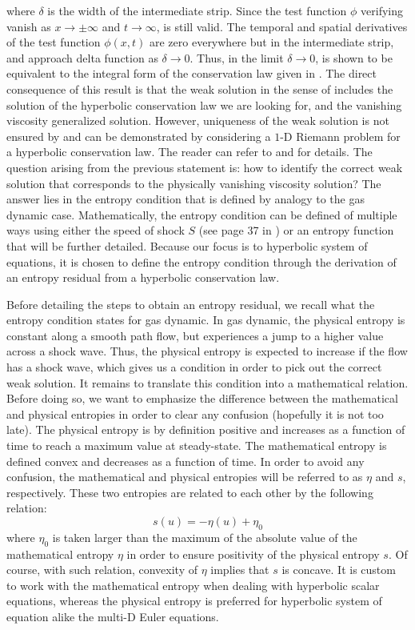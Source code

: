 where $\delta$ is the width of the intermediate strip. Since the test function $\phi$ verifying  vanish as $x \to \pm  \infty$ and $t \to \infty$,  is still valid. The temporal and spatial derivatives of the test function $\phi(x,t)$ are zero everywhere but in the intermediate strip, and approach delta function as $\delta \to 0$. Thus, in the limit $\delta \to 0$,  is shown to be equivalent to the integral form of the conservation law given in . The direct consequence of this result is that the weak solution in the sense of  includes the solution of the hyperbolic conservation law we are looking for, and the vanishing viscosity generalized solution. However, uniqueness of the weak solution is not ensured by  and can be demonstrated by considering a $1$-D Riemann problem for a hyperbolic conservation law. The reader can refer to \cite{Toro} and \cite{Leveque} for details. The question arising from the previous statement is: how to identify the correct weak solution that corresponds to the physically vanishing viscosity solution? The answer lies in the entropy condition that is defined by analogy to the gas dynamic case. Mathematically, the entropy condition can be defined of multiple ways using either the speed of shock $S$ (see page 37 in \cite{Leveque}) or an entropy function that will be further detailed. Because our focus is to hyperbolic system of equations, it is chosen to define the entropy condition through the derivation of an entropy residual from a hyperbolic conservation law. 

Before detailing the steps to obtain an entropy residual, we recall what the entropy condition states for gas dynamic. In gas dynamic, the physical entropy is constant along a smooth path flow, but experiences a jump to a higher value across a shock wave. Thus, the physical entropy is expected to increase if the flow has a shock wave, which gives us a condition in order to pick out the correct weak solution. It remains to translate this condition into a mathematical relation. Before doing so, we want to emphasize the difference between the mathematical and physical entropies in order to clear any confusion (hopefully it is not too late). The physical entropy is by definition positive and increases as a function of time to reach a maximum value at steady-state. The mathematical entropy is defined convex and decreases as a function of time. In order to avoid any confusion, the mathematical and physical entropies will be referred to as $\eta$ and $s$, respectively. These two entropies are related to each other by the following relation:
%
\begin{equation}
s(u) = -\eta (u) + \eta_0
\end{equation}
%  
where $\eta_0$ is taken larger than the maximum of the absolute value of the mathematical entropy $\eta$ in order to ensure positivity of the physical entropy $s$. Of course, with such relation, convexity of $\eta$ implies that $s$ is concave. It is custom to work with the mathematical entropy when dealing with hyperbolic scalar equations, whereas the physical entropy is preferred for hyperbolic system of equation alike the multi-D Euler equations. 

